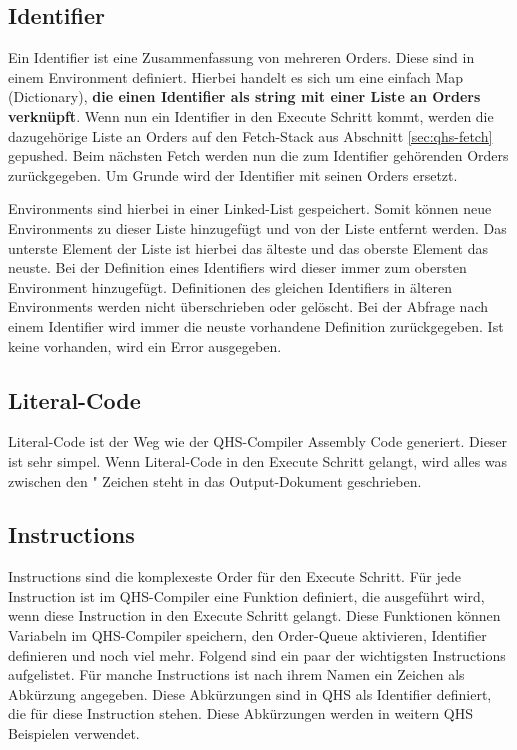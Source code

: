 \subsection{Identifier}
Ein Identifier ist eine Zusammenfassung von mehreren Orders. Diese sind in einem Environment definiert. Hierbei handelt es sich um eine einfach Map (Dictionary), \textbf{die einen Identifier als string mit einer Liste an Orders verknüpft}.
Wenn nun ein Identifier in den Execute Schritt kommt, werden die dazugehörige Liste an Orders auf den Fetch-Stack aus Abschnitt \ref{sec:qhs-fetch} gepushed.
Beim nächsten Fetch werden nun die zum Identifier gehörenden Orders zurückgegeben. Um Grunde wird der Identifier mit seinen Orders ersetzt.

Environments sind hierbei in einer Linked-List gespeichert. Somit können neue Environments zu dieser Liste hinzugefügt und von der Liste entfernt werden. Das unterste Element der Liste ist hierbei das älteste und das oberste Element das neuste.
Bei der Definition eines Identifiers wird dieser immer zum obersten Environment hinzugefügt. Definitionen des gleichen Identifiers in älteren Environments werden nicht überschrieben oder gelöscht.
Bei der Abfrage nach einem Identifier wird immer die neuste vorhandene Definition zurückgegeben. Ist keine vorhanden, wird ein Error ausgegeben.

\subsection{Literal-Code}
Literal-Code ist der Weg wie der QHS-Compiler Assembly Code generiert. Dieser ist sehr simpel. Wenn Literal-Code in den Execute Schritt gelangt, wird alles was zwischen den " Zeichen steht in das Output-Dokument geschrieben.

\subsection{Instructions}
Instructions sind die komplexeste Order für den Execute Schritt. Für jede Instruction ist im QHS-Compiler eine Funktion definiert, die ausgeführt wird, wenn diese Instruction in den Execute Schritt gelangt.
Diese Funktionen können Variabeln im QHS-Compiler speichern, den Order-Queue aktivieren, Identifier definieren und noch viel mehr. Folgend sind ein paar der wichtigsten Instructions aufgelistet.
Für manche Instructions ist nach ihrem Namen ein Zeichen als Abkürzung angegeben. Diese Abkürzungen sind in QHS als Identifier definiert, die für diese Instruction stehen. Diese Abkürzungen werden in weitern QHS Beispielen verwendet.

